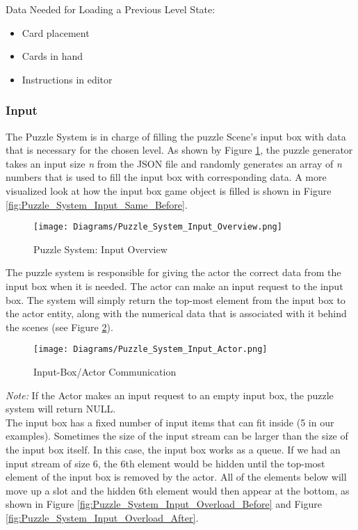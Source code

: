 Data Needed for Loading a Previous Level State:
\begin{itemize}
  \item Card placement
  \item Cards in hand
  \item Instructions in editor
\end{itemize}

\subsubsection{Input}
The Puzzle System is in charge of filling the puzzle Scene's input box with data
that is necessary for the chosen level. As shown by Figure \ref{fig:Puzzle_System_Input_Overview}, 
the puzzle generator takes an input size \textit{n} from the JSON file and randomly generates an array of 
\textit{n} numbers that is used to fill the input box with corresponding data. A more visualized
look at how the input box game object is filled is shown in Figure \ref{fig:Puzzle_System_Input_Same_Before}.\\

\begin{figure}[!hb]
  \caption{Puzzle System: Input Overview}
  \label{fig:Puzzle_System_Input_Overview}
  \centering
  \texttt{[image: Diagrams/Puzzle\_System\_Input\_Overview.png]}
\end{figure}

The puzzle system is responsible for giving the actor the correct data from the
input box when it is needed. The actor can make an input request to the input box.
The system will simply return the top-most element from the input box to the actor entity, along with the
numerical data that is associated with it behind the scenes (see Figure \ref{fig:Puzzle_System_Input_Actor}).\\

\begin{figure}[!hb]
  \caption{Input-Box/Actor Communication}
  \label{fig:Puzzle_System_Input_Actor}
  \centering
  \texttt{[image: Diagrams/Puzzle\_System\_Input\_Actor.png]}
\end{figure}

\textit{Note:} If the Actor makes an input request to an empty input box, the puzzle system
will return NULL.\\

The input box has a fixed number of input items that can fit inside (5 in our examples).
Sometimes the size of the input stream can be larger than the size of the input box
itself. In this case, the input box works as a queue. If we had an input stream of
size 6, the 6th element would be hidden until the top-most element of the input box
is removed by the actor. All of the elements below will move up a slot and the
hidden 6th element would then appear at the bottom, as shown in Figure \ref{fig:Puzzle_System_Input_Overload_Before} and
Figure \ref{fig:Puzzle_System_Input_Overload_After}.\\


